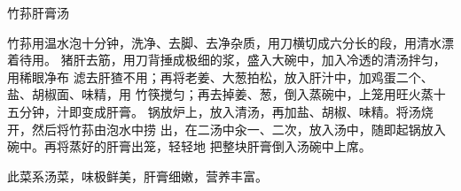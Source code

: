 \begin{recipe}{竹荪肝膏汤}

\ingredients


\preparation

\step 竹荪用温水泡十分钟，洗净、去脚、去净杂质，用刀横切成六分长的段，用清水漂
着待用。
\step 猪肝去筋，用刀背捶成极细的浆，盛入大碗中，加入冷透的清汤拌匀，用稀眼净布
滤去肝猹不用；再将老姜、大葱拍松，放入肝汁中，加鸡蛋二个、盐、胡椒面、味精，用
竹筷搅匀；再去掉姜、葱，倒入蒸碗中，上笼用旺火蒸十五分钟，汁即变成肝膏。
\step 锅放炉上，放入清汤，再加盐、胡椒、味精。将汤烧开，然后将竹荪由泡水中捞
出，在二汤中汆一、二次，放入汤中，随即起锅放入碗中。再将蒸好的肝膏出笼，轻轻地
把整块肝膏倒入汤碗中上席。

\features

此菜系汤菜，味极鲜美，肝膏细嫩，营养丰富。

\end{recipe}

